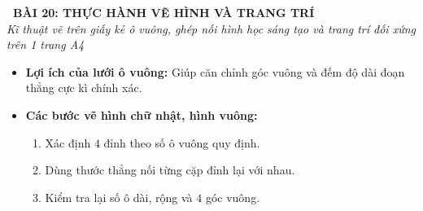 \documentclass[12pt,a4paper]{article}
\begin{document}
\begin{tcolorbox}[
  enhanced,
  colback=teal!8!white,
  colframe=teal!70!black,
  arc=3mm, boxrule=1.2pt,
  left=3mm, right=3mm, top=2mm, bottom=2mm,
  halign=center
]
  {\LARGE\bfseries\color{teal!90!black}\faBookmark\ BÀI 20: THỰC HÀNH VẼ HÌNH VÀ TRANG TRÍ}\\[1mm]
  {\itshape\footnotesize\color{black!75} Kĩ thuật vẽ trên giấy kẻ ô vuông, ghép nối hình học sáng tạo và trang trí đối xứng trên 1 trang A4}
\end{tcolorbox}

\vspace{-2mm}

\noindent
\begin{minipage}[t]{0.49\textwidth}\vspace{0pt}
\begin{tcolorbox}[
  enhanced,
  colback=blue!4!white,
  colframe=blue!75!black,
  arc=2mm, boxrule=0.8pt,
  left=2mm, right=2mm, top=1.8mm, bottom=1.8mm,
  title={\footnotesize\bfseries\color{white}\faPencil\ 1. Kĩ thuật vẽ trên lưới ô vuông}
]
{\footnotesize
\begin{itemize}\setlength{\itemsep}{1pt}\setlength{\leftskip}{-2.5mm}
  \item \textbf{Lợi ích của lưới ô vuông:} Giúp căn chỉnh góc vuông và đếm độ dài đoạn thẳng cực kì chính xác.
  \item \textbf{Các bước vẽ hình chữ nhật, hình vuông:}
  \begin{enumerate}\setlength{\itemsep}{0.5pt}\setlength{\leftskip}{-2.5mm}
    \item Xác định $4$ đỉnh theo số ô vuông quy định.
    \item Dùng thước thẳng nối từng cặp đỉnh lại với nhau.
    \item Kiểm tra lại số ô dài, rộng và $4$ góc vuông.
  \end{enumerate}
\end{itemize}
}
\end{tcolorbox}
\end{minipage}
\hfill
\end{document}
